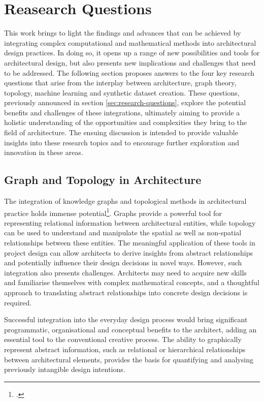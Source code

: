 \documentclass[a4paper, 12pt]{report}
\begin{document}
\section{Reasearch Questions}\label{sec:research-questions-conclusion}

This work brings to light the findings and advances that can be achieved by integrating complex computational and mathematical methods into architectural design practices. In doing so, it opens up a range of new possibilities and tools for architectural design, but also presents new implications and challenges that need to be addressed. The following section proposes answers to the four key research questions that arise from the interplay between architecture, graph theory, topology, machine learning and synthetic dataset creation. These questions, previously announced in section \ref{sec:research-questions}, explore the potential benefits and challenges of these integrations, ultimately aiming to provide a holistic understanding of the opportunities and complexities they bring to the field of architecture. The ensuing discussion is intended to provide valuable insights into these research topics and to encourage further exploration and innovation in these areas.

\subsection{Graph and Topology in Architecture}\label{sec:graph-and-topology-in-architecture-conclusion}

The integration of \glspl{knowledge graph} and topological methods in architectural practice holds immense potential\footcite{alymani2023classifying}. Graphs provide a powerful tool for representing relational information between architectural entities, while topology can be used to understand and manipulate the spatial as well as non-spatial relationships between these entities. The meaningful application of these tools in project design can allow architects to derive insights from abstract relationships and potentially influence their design decisions in novel ways. However, such integration also presents challenges. Architects may need to acquire new skills and familiarise themselves with complex mathematical concepts, and a thoughtful approach to translating abstract relationships into concrete design decisions is required.

Successful integration into the everyday design process would bring significant programmatic, organisational and conceptual benefits to the architect, adding an essential tool to the conventional creative process. The ability to graphically represent abstract information, such as relational or hierarchical relationships between architectural elements, provides the basis for quantifying and analysing previously intangible design intentions.
\end{document}
